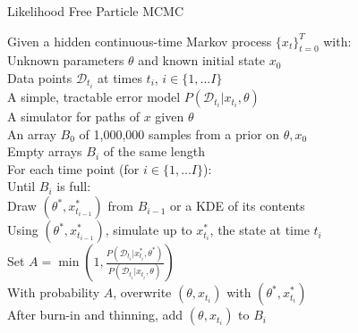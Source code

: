 \documentclass[12pt,a4paper,t,xcolor=dvipsnames,slidestop,compress,mathserif]{beamer}
\begin{document}
\begin{frame}{Likelihood Free Particle MCMC}

\begin{algorithm}[H]
Given a hidden continuous-time Markov process $\{x_t\}_{t=0}^T$ with: \\
\Indp \Indp
Unknown parameters $\theta$ and known initial state $x_0$\\
Data points $\mathcal{D}_{t_{i}}$ at times $t_{i}$, $i \in \{1, ... I\}$ \\
A simple, tractable error model $P(\mathcal{D}_{t_{i}}|x_{t_{i}}, \theta)$\\
A simulator for paths of $x$ given $\theta$\\
An array $B_0$ of 1,000,000 samples from a prior on $\theta, x_0$\\
Empty arrays $B_{i}$ of the same length\\

\Indm \Indm
For each time point (for $i \in \{1, ... I\}$):\\
\Indp\Indp
Until $B_{i}$ is full: \\
\Indp\Indp
Draw $(\theta^*, x_{t_{i-1}}^*)$ from $B_{i-1}$ or a KDE of its contents\\
Using $(\theta^*, x_{t_{i-1}}^*)$, simulate up to $x_{t_{i}}^*$, the state at time $t_{i}$ \\
Set $A=\min(1, \frac{P(\mathcal{D}_{t_{i}}|x_{t_{i}}^*, \theta^*)}{P(\mathcal{D}_{t_{i}}|x_{t_{i}}, \theta)})$\\
With probability $A$, overwrite $(\theta, x_{t_{i}})$ with $(\theta^*, x_{t_{i}}^*)$\\
After burn-in and thinning, add $(\theta, x_{t_{i}})$ to $B_{i}$\\

\end{algorithm}
\end{frame}
\end{document}
